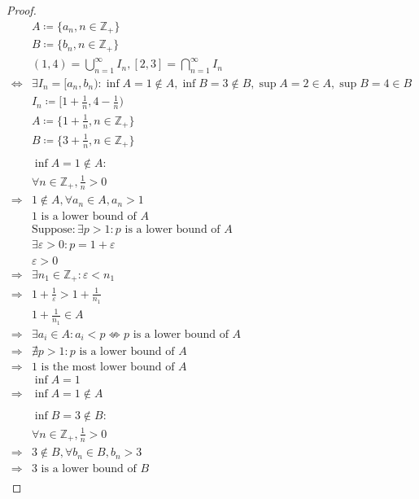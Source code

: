 \documentclass{article}
\begin{document}
\begin{proof}
    \begin{align*}
        &A\coloneqq\{a_n,n\in\mathbb{Z} _+\}\\
        &B\coloneqq\{b_n,n\in\mathbb{Z} _+\}\\
        &(1,4)=\bigcup_{n=1}^{\infty}I_n,[2,3]=\bigcap_{n=1}^{\infty}I_n\\
        \Leftrightarrow&\exists I_n=[a_n,b_n):\inf A=1\notin A,\inf B=3\notin B, \sup A=2\in A,\sup B=4\in B\\
        &I_n\coloneqq[1+\frac{1}{n},4-\frac{1}{n})\\
        &A\coloneqq\{1+\frac{1}{n},n\in\mathbb{Z} _+\}\\
        &B\coloneqq\{3+\frac{1}{n},n\in\mathbb{Z} _+\}\\
        &\\
        &\inf A=1\notin A:\\
        &\forall n\in\mathbb{Z} _+,\frac{1}{n}>0\\
        \Rightarrow&1\notin A, \forall a_n\in A,a_n>1\\
        &1\text{ is a lower bound of }A\\
        &\text{Suppose}: \exists p>1: p\text{ is a lower bound of }A\\
        &\exists \varepsilon>0:p=1+\varepsilon\\
        &\varepsilon>0\\
        \Rightarrow&\exists n_1\in\mathbb{Z} _+:\varepsilon<n_1\\
        \Rightarrow&1+\frac{1}{\varepsilon}>1+\frac{1}{n_1}\\
        &1+\frac{1}{n_1}\in A\\
        \Rightarrow&\exists a_i\in A:a_i<p\nLeftrightarrow p\text{ is a lower bound of }A\\
        \Rightarrow&\nexists p>1:p\text{ is a lower bound of }A\\
        \Rightarrow&1\text{ is the most lower bound of }A\\
        &\inf A=1\\
        \Rightarrow&\inf A=1\notin A\\
        &\\
        &\inf B=3\notin B:\\
        &\forall n\in\mathbb{Z} _+,\frac{1}{n}>0\\
        \Rightarrow&3\notin B,\forall b_n\in B, b_n>3\\
        \Rightarrow&3\text{ is a lower bound of }B\\

\end{align*}
\end{proof}
\end{document}
